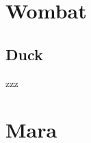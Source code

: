 \documentclass{report}
\makeatletter
\newcommand{\extraPartText}[1]{\def\@extraPartText{#1}}
\makeatother
\begin{document}
\tableofcontents
\extraPartText{Always be friendly to ducks, capybaras and wombats.}
\part{Wombat}

\chapter{Duck}
zzz

\part{Mara}
\end{document}
